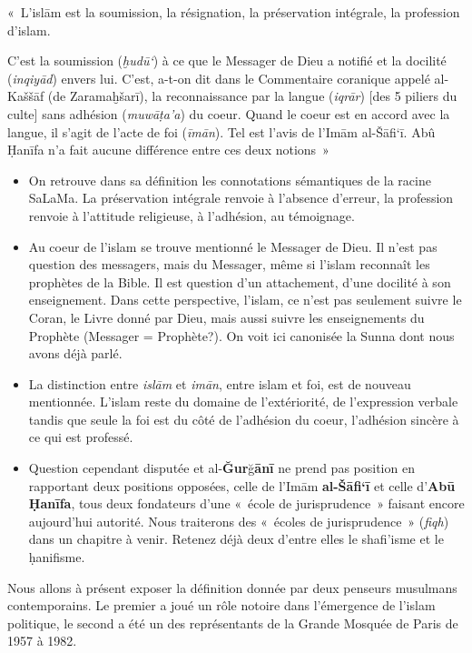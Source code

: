 \begin{Def}
«~L'islām est la soumission, la résignation, la préservation intégrale,
la profession d'islam.

C'est la soumission (\emph{ḫudū`}) à ce que le Messager de Dieu a
notifié et la docilité (\emph{inqiyād}) envers lui. C'est, a-t-on dit
dans le Commentaire coranique appelé al-Kaššāf (de Zaramaḫšarī), la
reconnaissance par la langue (\emph{iqrār}) {[}des 5 piliers du culte{]}
sans adhésion (\emph{muwāṭa'a}) du coeur. Quand le coeur est en accord
avec la langue, il s'agit de l'acte de foi (\emph{īmān}). Tel est l'avis
de l'Imām al-Šāfi`ī. Abû Ḥanīfa n'a fait aucune différence entre ces
deux notions~»
\end{Def}


\begin{itemize}
\item
  On retrouve dans sa définition les connotations sémantiques de la
  racine SaLaMa. La préservation intégrale renvoie à l'absence d'erreur,
  la profession renvoie à l'attitude religieuse, à l'adhésion, au
  témoignage.
\item
  Au coeur de l'islam se trouve mentionné le Messager de Dieu. Il n'est
  pas question des messagers, mais du Messager, même si l'islam
  reconnaît les prophètes de la Bible. Il est question d'un attachement,
  d'une docilité à son enseignement. Dans cette perspective, l'islam, ce
  n'est pas seulement suivre le Coran, le Livre donné par Dieu, mais
  aussi suivre les enseignements du Prophète (Messager = Prophète?). On
  voit ici canonisée la Sunna dont nous avons déjà parlé.
\item
  La distinction entre \emph{islām} et \emph{imān}, entre islam et foi,
  est de nouveau mentionnée. L'islam reste du domaine de l'extériorité,
  de l'expression verbale tandis que seule la foi est du côté de
  l'adhésion du coeur, l'adhésion sincère à ce qui est professé.
\item
  Question cependant disputée et al-\textbf{Ğur}ğ\textbf{ānī} ne prend
  pas position en rapportant deux positions opposées, celle de l'Imām
  \textbf{al-Šāfi`ī} et celle d'\textbf{Abū Ḥanīfa}, tous deux
  fondateurs d'une «~école de jurisprudence~» faisant encore aujourd'hui
  autorité. Nous traiterons des «~écoles de jurisprudence~»
  (\emph{fiqh}) dans un chapitre à venir. Retenez déjà deux d'entre
  elles le shafi'isme et le ḥanifisme.
\end{itemize}

Nous allons à présent exposer la définition donnée par deux penseurs
musulmans contemporains. Le premier a joué un rôle notoire dans
l'émergence de l'islam politique, le second a été un des représentants
de la Grande Mosquée de Paris de 1957 à 1982.

